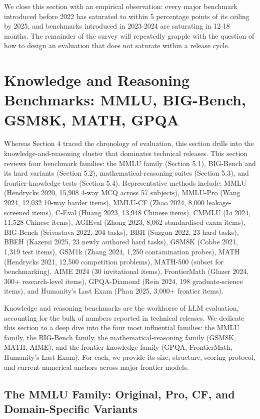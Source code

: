 \documentclass{article}
\begin{document}
We close this section with an empirical observation: every major benchmark introduced before 2022 has saturated to within 5 percentage points of its ceiling by 2025, and benchmarks introduced in 2023-2024 are saturating in 12-18 months. The remainder of the survey will repeatedly grapple with the question of how to design an evaluation that does not saturate within a release cycle.

\section{Knowledge and Reasoning Benchmarks: MMLU, BIG-Bench, GSM8K, MATH, GPQA}\label{knowledge-and-reasoning-benchmarks-mmlu-big-bench-gsm8k-math-gpqa}

Whereas Section 4 traced the chronology of evaluation, this section drills into the knowledge-and-reasoning cluster that dominates technical releases. This section reviews four benchmark families: the MMLU family (Section 5.1), BIG-Bench and its hard variants (Section 5.2), mathematical-reasoning suites (Section 5.3), and frontier-knowledge tests (Section 5.4). Representative methods include: MMLU (Hendrycks 2020, 15,908 4-way MCQ across 57 subjects), MMLU-Pro (Wang 2024, 12,032 10-way harder items), MMLU-CF (Zhao 2024, 8,000 leakage-screened items), C-Eval (Huang 2023, 13,948 Chinese items), CMMLU (Li 2024, 11,528 Chinese items), AGIEval (Zhong 2023, 8,062 standardised exam items), BIG-Bench (Srivastava 2022, 204 tasks), BBH (Suzgun 2022, 23 hard tasks), BBEH (Kazemi 2025, 23 newly authored hard tasks), GSM8K (Cobbe 2021, 1,319 test items), GSM1k (Zhang 2024, 1,250 contamination probes), MATH (Hendrycks 2021, 12,500 competition problems), MATH-500 (subset for benchmarking), AIME 2024 (30 invitational items), FrontierMath (Glazer 2024, 300+ research-level items), GPQA-Diamond (Rein 2024, 198 graduate-science items), and Humanity's Last Exam (Phan 2025, 3,000+ frontier items).

Knowledge and reasoning benchmarks are the workhorse of LLM evaluation, accounting for the bulk of numbers reported in technical releases. We dedicate this section to a deep dive into the four most influential families: the MMLU family, the BIG-Bench family, the mathematical-reasoning family (GSM8K, MATH, AIME), and the frontier-knowledge family (GPQA, FrontierMath, Humanity's Last Exam). For each, we provide its size, structure, scoring protocol, and current numerical anchors across major frontier models.

\subsection{The MMLU Family: Original, Pro, CF, and Domain-Specific Variants}\label{the-mmlu-family-original-pro-cf-and-domain-specific-variants}
\end{document}
